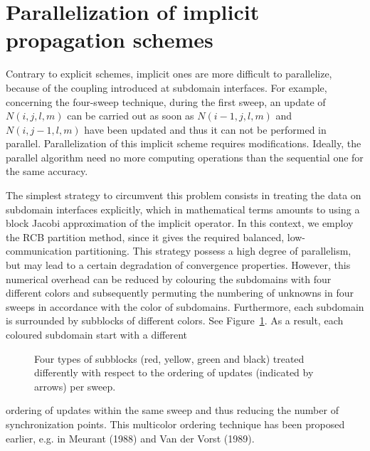 \documentclass[12pt]{book}
\begin{document}
\section{Parallelization of implicit propagation schemes} \label{sec:imp}

Contrary to explicit schemes, implicit ones are more difficult to parallelize, because of
the coupling introduced at subdomain interfaces. For example, concerning the four-sweep
technique, during the first sweep, an update of $N(i,j,l,m)$ can be carried out as soon as
$N(i-1,j,l,m)$ and $N(i,j-1,l,m)$ have been updated and thus it can not be performed in
parallel. Parallelization of this implicit scheme requires modifications. Ideally, the
parallel algorithm need no more computing operations than the sequential one for the same
accuracy.

The simplest strategy to circumvent this problem consists in treating the data on subdomain
interfaces explicitly, which in mathematical terms amounts to using a block Jacobi
approximation of the implicit operator. In this context, we employ the RCB partition method,
since it gives the required balanced, low-communication partitioning. This strategy possess
a high degree of parallelism, but may lead to a certain degradation of convergence properties.
However, this numerical overhead can be reduced by colouring the subdomains with four different
colors and subsequently permuting the numbering of unknowns in four sweeps in accordance with
the color of subdomains. Furthermore, each subdomain is surrounded by subblocks of different
colors. See Figure~\ref{fig:colb}. As a result, each coloured subdomain start with a different
\begin{figure}[htb]
   \centerline{
              }
      \caption{Four types of subblocks (red, yellow, green and black) treated differently
               with respect to the ordering of updates (indicated by arrows) per sweep.}
      \label{fig:colb}
\end{figure}
ordering of updates within the same sweep and thus reducing the number of synchronization
points. This multicolor ordering technique has been proposed earlier, e.g. in Meurant (1988)
and Van der Vorst (1989).
\end{document}

